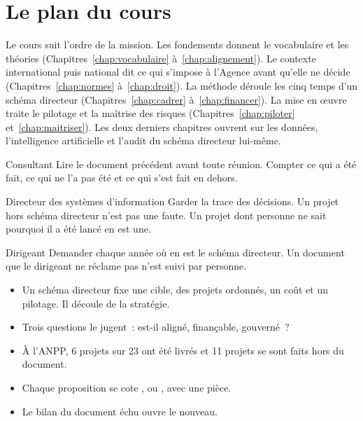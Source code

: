 \section{Le plan du cours}
\label{sec:p-plan}

Le cours suit l'ordre de la mission. Les fondements donnent le vocabulaire et les théories
(Chapitres~\ref{chap:vocabulaire} à~\ref{chap:alignement}). Le contexte international puis national dit ce qui
s'impose à l'Agence avant qu'elle ne décide (Chapitres~\ref{chap:normes} à~\ref{chap:droit}). La méthode
déroule les cinq temps d'un schéma directeur (Chapitres~\ref{chap:cadrer} à~\ref{chap:financer}). La mise en
œuvre traite le pilotage et la maîtrise des risques (Chapitres~\ref{chap:piloter} et~\ref{chap:maitriser}).
Les deux derniers chapitres ouvrent sur les données, l'intelligence artificielle et l'audit du schéma directeur
lui-même.

\begin{boxmetier}{Consultant}
Lire le document précédent avant toute réunion. Compter ce qui a été fait, ce qui ne l'a pas été et ce qui s'est fait en dehors.
\end{boxmetier}

\begin{boxmetier}{Directeur des systèmes d'information}
Garder la trace des décisions. Un projet hors schéma directeur n'est pas une faute. Un projet dont personne ne sait pourquoi il a été lancé en est une.
\end{boxmetier}

\begin{boxmetier}{Dirigeant}
Demander chaque année où en est le schéma directeur. Un document que le dirigeant ne réclame pas n'est suivi par personne.
\end{boxmetier}

\begin{boxresume}
\begin{itemize}
    \item Un schéma directeur fixe une cible, des projets ordonnés, un coût et un pilotage. Il découle de la stratégie.
    \item Trois questions le jugent~: est-il aligné, finançable, gouverné~?
    \item À l'ANPP, 6 projets sur 23 ont été livrés et 11 projets se sont faits hors du document.
    \item Chaque proposition se cote \OUI{}, \NON{} ou \NEK{}, avec une pièce.
    \item Le bilan du document échu ouvre le nouveau.
\end{itemize}
\end{boxresume}

